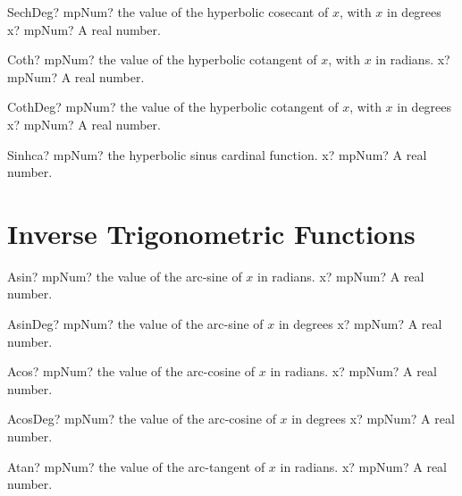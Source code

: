 \documentclass[12pt,a4paper,openany]{book}
\begin{document}
\begin{mpFunctionsExtract}
\mpFunctionOne
{SechDeg? mpNum? the value of the hyperbolic cosecant of $x$, with $x$ in degrees}
{x? mpNum? A real number.}
\end{mpFunctionsExtract}

\begin{mpFunctionsExtract}
\mpFunctionOne
{Coth? mpNum? the value of the hyperbolic cotangent of $x$, with $x$ in radians.}
{x? mpNum? A real number.}
\end{mpFunctionsExtract}

\begin{mpFunctionsExtract}
\mpFunctionOne
{CothDeg? mpNum? the value of the hyperbolic cotangent of $x$, with $x$ in degrees}
{x? mpNum? A real number.}
\end{mpFunctionsExtract}

\begin{mpFunctionsExtract}
\mpFunctionOne
{Sinhca? mpNum? the hyperbolic sinus cardinal function.}
{x? mpNum? A real number.}
\end{mpFunctionsExtract}

\section{Inverse Trigonometric Functions}

\begin{mpFunctionsExtract}
\mpFunctionOne
{Asin? mpNum? the value of the arc-sine of $x$ in radians.}
{x? mpNum? A real number.}
\end{mpFunctionsExtract}

\begin{mpFunctionsExtract}
\mpFunctionOne
{AsinDeg? mpNum? the value of the arc-sine of $x$ in degrees}
{x? mpNum? A real number.}
\end{mpFunctionsExtract}

\begin{mpFunctionsExtract}
\mpFunctionOne
{Acos? mpNum? the value of the arc-cosine of $x$ in radians.}
{x? mpNum? A real number.}
\end{mpFunctionsExtract}

\begin{mpFunctionsExtract}
\mpFunctionOne
{AcosDeg? mpNum? the value of the arc-cosine of $x$ in degrees}
{x? mpNum? A real number.}
\end{mpFunctionsExtract}

\begin{mpFunctionsExtract}
\mpFunctionOne
{Atan? mpNum? the value of the arc-tangent of $x$ in radians.}
{x? mpNum? A real number.}
\end{mpFunctionsExtract}
\end{document}
